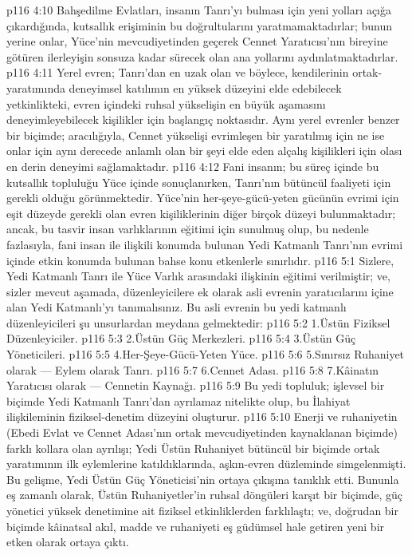 \vs p116 4:10 Bahşedilme Evlatları, insanın Tanrı’yı bulması için yeni yolları açığa çıkardığında, kutsallık erişiminin bu doğrultularını yaratmamaktadırlar; bunun yerine onlar, Yüce’nin mevcudiyetinden geçerek Cennet Yaratıcısı’nın bireyine götüren ilerleyişin sonsuza kadar sürecek olan ana yollarını aydınlatmaktadırlar.
\vs p116 4:11 Yerel evren; Tanrı’dan en uzak olan ve böylece, kendilerinin ortak\hyp{}yaratımında deneyimsel katılımın en yüksek düzeyini elde edebilecek yetkinlikteki, evren içindeki ruhsal yükselişin en büyük aşamasını deneyimleyebilecek kişilikler için başlangıç noktasıdır. Aynı yerel evrenler benzer bir biçimde; aracılığıyla, Cennet yükselişi evrimleşen bir yaratılmış için ne ise onlar için aynı derecede anlamlı olan bir şeyi elde eden alçalış kişilikleri için olası en derin deneyimi sağlamaktadır.
\vs p116 4:12 Fani insanın; bu süreç içinde bu kutsallık topluluğu Yüce içinde sonuçlanırken, Tanrı’nın bütüncül faaliyeti için gerekli olduğu görünmektedir. Yüce’nin her\hyp{}şeye\hyp{}gücü\hyp{}yeten gücünün evrimi için eşit düzeyde gerekli olan evren kişiliklerinin diğer birçok düzeyi bulunmaktadır; ancak, bu tasvir insan varlıklarının eğitimi için sunulmuş olup, bu nedenle fazlasıyla, fani insan ile ilişkili konumda bulunan Yedi Katmanlı Tanrı’nın evrimi içinde etkin konumda bulunan bahse konu etkenlerle sınırlıdır.
\vs p116 5:1 Sizlere, Yedi Katmanlı Tanrı ile Yüce Varlık arasındaki ilişkinin eğitimi verilmiştir; ve, sizler mevcut aşamada, düzenleyicilere ek olarak asli evrenin yaratıcılarını içine alan Yedi Katmanlı’yı tanımalısınız. Bu asli evrenin bu yedi katmanlı düzenleyicileri şu unsurlardan meydana gelmektedir:
\vs p116 5:2 1.\bibnobreakspace Üstün Fiziksel Düzenleyiciler.
\vs p116 5:3 2.\bibnobreakspace Üstün Güç Merkezleri.
\vs p116 5:4 3.\bibnobreakspace Üstün Güç Yöneticileri.
\vs p116 5:5 4.\bibnobreakspace Her\hyp{}Şeye\hyp{}Gücü\hyp{}Yeten Yüce.
\vs p116 5:6 5.\bibnobreakspace Sınırsız Ruhaniyet olarak --- Eylem olarak Tanrı.
\vs p116 5:7 6.\bibnobreakspace Cennet Adası.
\vs p116 5:8 7.\bibnobreakspace Kâinatın Yaratıcısı olarak --- Cennetin Kaynağı.
\vs p116 5:9 Bu yedi topluluk; işlevsel bir biçimde Yedi Katmanlı Tanrı’dan ayrılamaz nitelikte olup, bu İlahiyat ilişkileminin fiziksel\hyp{}denetim düzeyini oluşturur.
\vs p116 5:10 Enerji ve ruhaniyetin (Ebedi Evlat ve Cennet Adası’nın ortak mevcudiyetinden kaynaklanan biçimde) farklı kollara olan ayrılışı; Yedi Üstün Ruhaniyet bütüncül bir biçimde ortak yaratımının ilk eylemlerine katıldıklarında, aşkın\hyp{}evren düzleminde simgelenmişti. Bu gelişme, Yedi Üstün Güç Yöneticisi’nin ortaya çıkışına tanıklık etti. Bununla eş zamanlı olarak, Üstün Ruhaniyetler’in ruhsal döngüleri karşıt bir biçimde, güç yönetici yüksek denetimine ait fiziksel etkinliklerden farklılaştı; ve, doğrudan bir biçimde kâinatsal akıl, madde ve ruhaniyeti eş güdümsel hale getiren yeni bir etken olarak ortaya çıktı.
